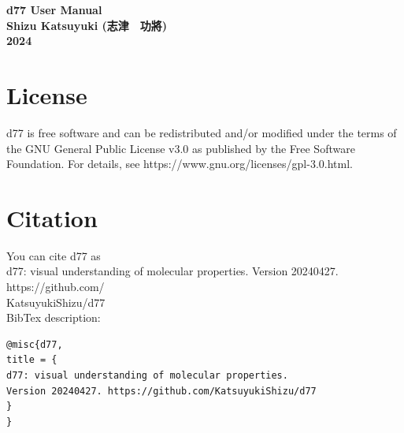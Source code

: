 ﻿\documentclass[11pt,a4paper,openany]{article}
\begin{document}
\pagestyle{empty}
{\textbf{}}
\vspace{30mm}
\begin{center}
{\bf
\Huge{d77 User Manual} \\
\vspace{10mm} 
\vspace{100mm}       
\LARGE{Shizu Katsuyuki (志津　功將)}\\
\vspace{10mm} 
\LARGE{2024}
}
\end{center}
\clearpage

\pagestyle{plain}


\section{License}
\noindent
d77 is free software and can be redistributed and/or modified
under the terms of the GNU General Public License v3.0
as published by the Free Software Foundation.
For details, see https://www.gnu.org/licenses/gpl-3.0.html.

\section{Citation}
\noindent
You can cite d77 as\vspace{3mm}\\
d77: visual understanding of molecular properties. Version 20240427. https://github.com/\\
KatsuyukiShizu/d77\\

\noindent
BibTex description:
\begin{verbatim}
@misc{d77,
title = {
d77: visual understanding of molecular properties. 
Version 20240427. https://github.com/KatsuyukiShizu/d77
}
}
\end{verbatim}
\end{document}
